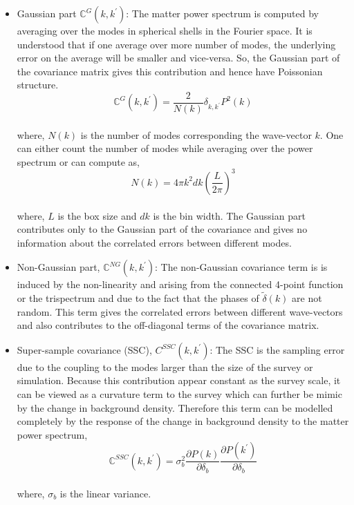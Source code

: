 \begin{itemize}
	\item Gaussian part $\mathbb{C}^{G}(k,k^{\prime})$: The matter power spectrum is computed
			by averaging over the modes in spherical shells in the Fourier space. It 
			is understood that if one average over more number of modes, the underlying
			error on the average will be smaller and vice-versa. So, the Gaussian part
			of the covariance matrix gives this contribution and hence have Poissonian
			structure. 
			\begin{equation}
				\mathbb{C}^{G}(k,k^{\prime}) = \dfrac{2}{N(k)} \delta_{k,k^{\prime}} P^2(k)
			\end{equation}
			\\
			where, $N(k)$ is the number of modes corresponding the wave-vector $k$. One 
			can either count the number of modes while averaging over the power spectrum
			or can compute as,
			\begin{equation}
				N(k) = 4 \pi k^2 dk \left( \dfrac{L}{2\pi} \right)^3
			\end{equation}
			\\
			where, $L$ is the box size and $dk$ is the bin width. The Gaussian part 
			contributes only to the Gaussian part of the covariance and gives no 
			information about the correlated errors between different modes. 

	\item Non-Gaussian part, $\mathbb{C}^{NG}(k,k^{\prime})$: The non-Gaussian covariance term is 
			is induced by the non-linearity and arising from the connected 4-point function or the trispectrum and due to the fact that the phases of $\tilde{\delta}(k)$ are 
			not random. This term gives the correlated errors between
			different wave-vectors and also contributes to the off-diagonal terms
			of the covariance matrix. 

	\item Super-sample covariance (SSC), $C^{SSC}(k,k^{\prime})$: The SSC is the sampling
			error due to the coupling to the modes larger than the size of the survey or
			simulation. Because this contribution appear constant as the survey scale, it 
			can be viewed as a curvature term to the survey which can further be mimic
			by the change in background density. Therefore this term can be modelled
			completely by the response of the change in background density to the
			matter power spectrum,
			\begin{equation}
				\mathbb{C}^{SSC}(k,k^{\prime}) = \sigma_b^2 \dfrac{\partial P(k)}{\partial \delta_b}
										\dfrac{\partial P(k^{\prime})}{\partial \delta_b}
			\end{equation}
			\\
			where, $\sigma_b$ is the linear variance. 
\end{itemize}

